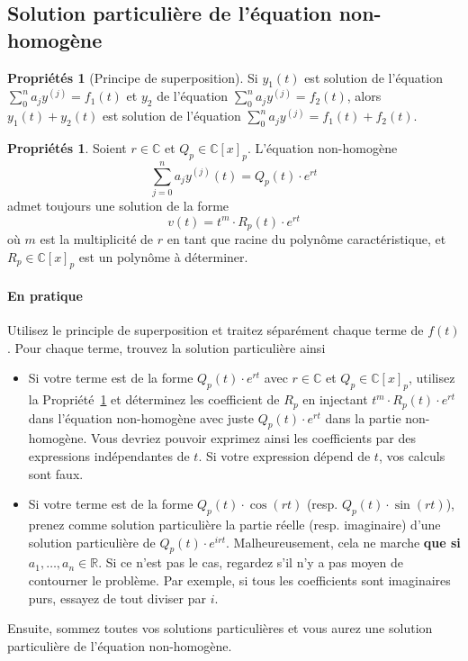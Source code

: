 \documentclass[11pt,a4paper]{article}
\theoremstyle{definition}
\newtheorem{myprop}[mydef]{Propriétés}
\newcommand{\R}{\mathbb{R}}
\newcommand{\C}{\mathbb{C}}
\begin{document}
\subsection{Solution particulière de l'équation non-homogène}
\begin{myprop}[Principe de superposition]
	Si $y_1(t)$ est solution de l'équation $\sum_0^n a_j y^{(j)} = f_1(t)$ et $y_2$ de l'équation $\sum_0^n a_j y^{(j)} = f_2(t)$,
	alors $y_1(t) + y_2(t)$ est solution de l'équation $\sum_0^n a_j y^{(j)} = f_1(t) + f_2(t)$.
\end{myprop}

\begin{myprop}
	\label{prop:part}
	Soient $r \in \C$ et $Q_p \in \C[x]_p$.
	L'équation non-homogène
	\[ \sum_{j=0}^n a_j y^{(j)}(t) = Q_p(t) \cdot e^{rt} \]
	admet toujours une solution de la forme
	\[ v(t) = t^m \cdot R_p(t) \cdot e^{rt} \]
	où $m$ est la multiplicité de $r$ en tant que racine du polynôme caractéristique,
	et $R_p \in \C[x]_p$ est un polynôme à déterminer.
\end{myprop}

\paragraph{En pratique}
Utilisez le principle de superposition et traitez séparément chaque terme de $f(t)$.
Pour chaque terme, trouvez la solution particulière ainsi
\begin{itemize}
	\item Si votre terme est de la forme $Q_p(t) \cdot e^{rt}$ avec $r \in \C$ et $Q_p \in \C[x]_p$,
		utilisez la Propriété~\ref{prop:part} et déterminez les coefficient de $R_p$ en injectant
		$t^m \cdot R_p(t) \cdot e^{rt}$ dans l'équation non-homogène avec juste $Q_p(t) \cdot e^{rt}$
		dans la partie non-homogène.
		Vous devriez pouvoir exprimez ainsi les coefficients par des expressions indépendantes de $t$.
		Si votre expression dépend de $t$, vos calculs sont faux.
	\item Si votre terme est de la forme $Q_p(t) \cdot \cos(rt)$ (resp. $Q_p(t) \cdot \sin(rt)$),
		prenez comme solution particulière la partie réelle (resp. imaginaire) d'une solution particulière de
		$Q_p(t) \cdot e^{irt}$.
		Malheureusement, cela ne marche \textbf{que si $a_1, \dots, a_n \in \R$}.
		Si ce n'est pas le cas, regardez s'il n'y a pas moyen de contourner le problème.
		Par exemple, si tous les coefficients sont imaginaires purs, essayez de tout diviser par $i$.
\end{itemize}
Ensuite, sommez toutes vos solutions particulières et vous aurez une solution particulière de l'équation non-homogène.
\end{document}
